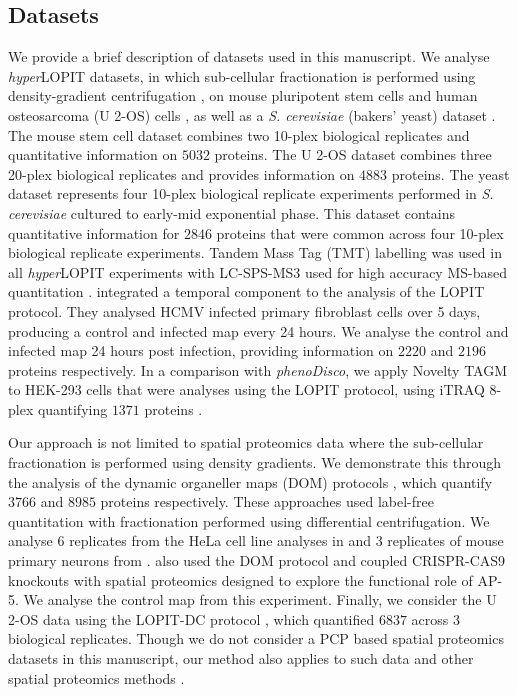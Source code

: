 \documentclass[12pt,english]{article}
\begin{document}
\subsection{Datasets}
We provide a brief description of datasets used in this manuscript. We analyse \textit{hyper}LOPIT datasets, in which sub-cellular fractionation is performed using density-gradient centrifugation \citep{Dunkley:2004, Dunkley:2006, Mulvey:2017}, on mouse pluripotent stem cells \citep{hyper} and human osteosarcoma (U 2-OS) cells \citep{Thul:2017, DC:2018}, as well as a \textit{S. cerevisiae} (bakers' yeast) dataset \citep{Nightingale::2019}. The mouse stem cell dataset combines two 10-plex biological replicates and quantitative information on $5032$ proteins. The U 2-OS dataset combines three 20-plex biological replicates and provides information on $4883$ proteins. The yeast dataset represents four 10-plex biological replicate experiments performed in \textit{S. cerevisiae} cultured to early-mid exponential phase. This dataset contains quantitative information for $2846$ proteins that were common across four 10-plex biological replicate experiments. Tandem Mass Tag (TMT) \citep{Thompson:2003} labelling was used in all \textit{hyper}LOPIT experiments with LC-SPS-MS3 used for high accuracy MS-based quantitation \citep{Ting:2011, Mcalister::2014}. \cite{Jean_Beltran:2016} integrated a temporal component to the analysis of the LOPIT protocol. They analysed HCMV infected primary fibroblast cells over 5 days, producing a control and infected map every 24 hours. We analyse the control and infected map 24 hours post infection, providing information on $2220$ and $2196$ proteins respectively. In a comparison with \textit{phenoDisco}, we apply Novelty TAGM to HEK-293 cells that were analyses using the LOPIT protocol, using iTRAQ 8-plex quantifying $1371$ proteins \citep{Breckels:2013}.

Our approach is not limited to spatial proteomics data where the sub-cellular fractionation is performed using density gradients. We demonstrate this through the analysis of the dynamic organeller maps (DOM) protocols \citep{Itzhak:2016, Itzhak::2017}, which quantify $3766$ and $8985$ proteins respectively. These approaches used label-free quantitation with fractionation performed using differential centrifugation. We analyse $6$ replicates from the HeLa cell line analyses in \cite{Itzhak:2016} and $3$ replicates of mouse primary neurons from \cite{Itzhak::2017}. \cite{Hirst:2018} also used the DOM protocol and coupled CRISPR-CAS9 knockouts with spatial proteomics designed to explore the functional role of AP-5. We analyse the control map from this experiment. Finally, we consider the U 2-OS data using the LOPIT-DC protocol \citep{DC:2018}, which quantified $6837$ across $3$ biological replicates. Though we do not consider a PCP based spatial proteomics datasets in this manuscript, our method also applies to such data \citep{Foster:2006, kristensen:2012, kristensen:2014} and other spatial proteomics methods \citep{Orre:2019}.
\end{document}

